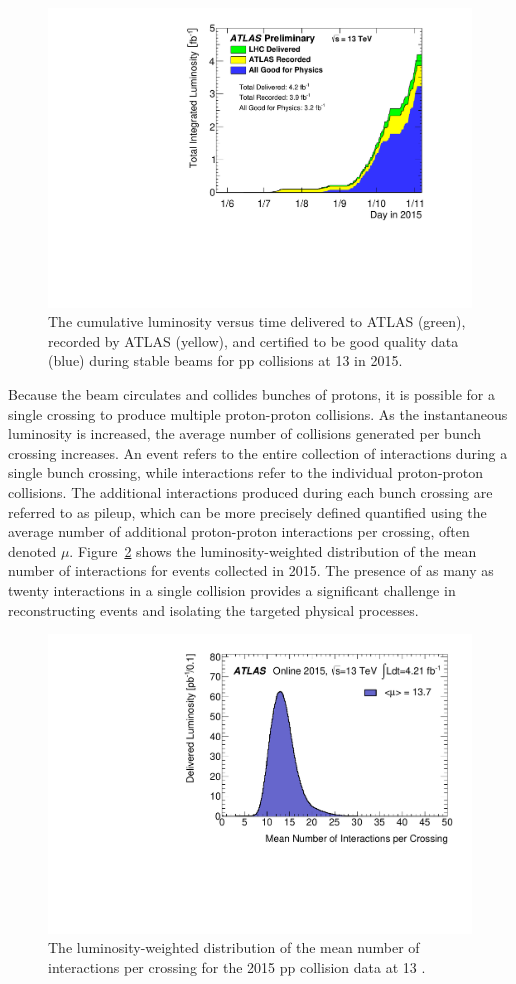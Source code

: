 \begin{figure}
\centering
\includegraphics[width=\fullfig]{figures/lumi_2015.pdf}
\caption{The cumulative luminosity versus time delivered to ATLAS (green), recorded by ATLAS (yellow), and certified to be good quality data (blue) during stable beams for pp collisions at 13 \TeV in 2015.}
\label{fig:lumi_2015}
\end{figure}

Because the beam circulates and collides bunches of protons, it is possible for a single crossing to produce multiple proton-proton collisions.
As the instantaneous luminosity is increased, the average number of collisions generated per bunch crossing increases.
An event refers to the entire collection of interactions during a single bunch crossing, while interactions refer to the individual proton-proton collisions.
The additional interactions produced during each bunch crossing are referred to as pileup, which can be more precisely defined quantified using the average number of additional proton-proton interactions per crossing, often denoted $\mu$.
Figure~\ref{fig:mu_2015} shows the luminosity-weighted distribution of the mean number of interactions for events collected in 2015.
The presence of as many as twenty interactions in a single collision provides a significant challenge in reconstructing events and isolating the targeted physical processes. 

\begin{figure}
\centering
\includegraphics[width=\fullfig]{figures/mu_2015.pdf}
\caption{The luminosity-weighted distribution of the mean number of interactions per crossing for the 2015 pp collision data at 13 \TeV.}
\label{fig:mu_2015}
\end{figure}
